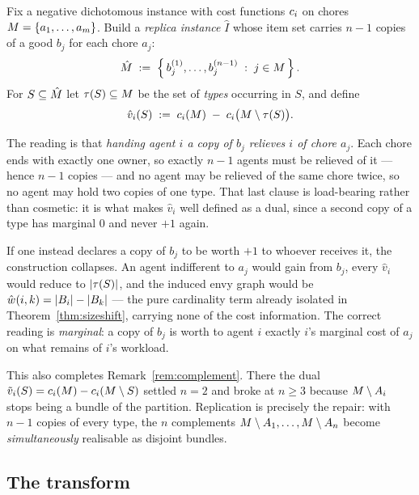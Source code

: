 Fix a negative dichotomous instance with cost functions $c_i$ on chores
$M = \left\{a_1,\dots,a_m\right\}$. Build a \emph{replica instance} $\hat{I}$ whose
item set carries $n-1$ copies of a good $b_j$ for each chore $a_j$:
\[
  \hat{M} \;:=\; \left\{\, b_j^{(1)}, \dots, b_j^{(n-1)} \;:\; j \in M \,\right\}.
\]
For $S \subseteq \hat{M}$ let $\tau(S) \subseteq M$ be the set of
\emph{types} occurring in $S$, and define
\[
  \hat{v}_i(S) \;:=\; c_i(M) \;-\; c_i\big(M \setminus \tau(S)\big).
\]

The reading is that \emph{handing agent $i$ a copy of $b_j$ relieves $i$ of
chore $a_j$}. Each chore ends with exactly one owner, so exactly $n-1$ agents
must be relieved of it --- hence $n-1$ copies --- and no agent may be relieved
of the same chore twice, so no agent may hold two copies of one type. That last
clause is load-bearing rather than cosmetic: it is what makes $\hat{v}_i$
well defined as a dual, since a second copy of a type has marginal $0$ and never
$+1$ again.

\begin{remark}
\label{rem:naive}
If one instead declares a copy of $b_j$ to be worth $+1$ to whoever receives it,
the construction collapses. An agent indifferent to $a_j$ would gain from
$b_j$, every $\hat{v}_i$ would reduce to $\left\lvert\tau(S)\right\rvert$, and the induced envy
graph would be $\hat{w_{}}(i,k) = \left\lvert B_i\right\rvert - \left\lvert B_k\right\rvert$ --- the pure
cardinality term already isolated in Theorem~\ref{thm:sizeshift}, carrying none
of the cost information. The correct reading is \emph{marginal}: a copy of $b_j$
is worth to agent $i$ exactly $i$'s marginal cost of $a_j$ on what remains of
$i$'s workload.
\end{remark}

This also completes Remark~\ref{rem:complement}. There the dual
$\tilde{v}_i(S) = c_i(M) - c_i(M \setminus S)$ settled $n = 2$
and broke at $n \ge 3$ because $M \setminus A_{i}$ stops being a
bundle of the partition. Replication is precisely the repair: with $n-1$ copies
of every type, the $n$ complements $M \setminus A_{1}, \dots,
M \setminus A_{n}$ become \emph{simultaneously} realisable as disjoint
bundles.

\subsection{The transform}
\label{sec:thmH}

